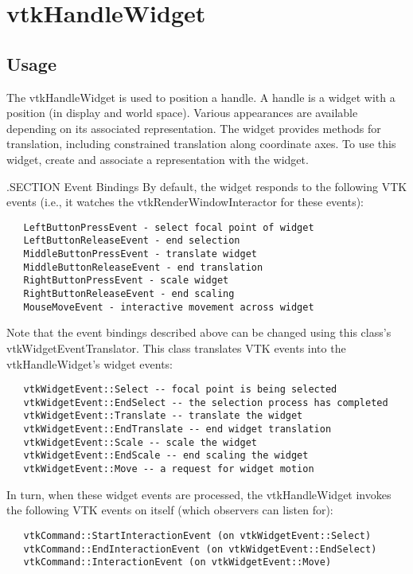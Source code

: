 \section{vtkHandleWidget}

\subsection{Usage}

 The vtkHandleWidget is used to position a handle.  A handle is a widget
 with a position (in display and world space). Various appearances are
 available depending on its associated representation. The widget provides
 methods for translation, including constrained translation along
 coordinate axes. To use this widget, create and associate a representation
 with the widget.

 .SECTION Event Bindings
 By default, the widget responds to the following VTK events (i.e., it
 watches the vtkRenderWindowInteractor for these events):
 \begin{verbatim}
   LeftButtonPressEvent - select focal point of widget
   LeftButtonReleaseEvent - end selection
   MiddleButtonPressEvent - translate widget
   MiddleButtonReleaseEvent - end translation
   RightButtonPressEvent - scale widget
   RightButtonReleaseEvent - end scaling
   MouseMoveEvent - interactive movement across widget
 \end{verbatim}

 Note that the event bindings described above can be changed using this
 class's vtkWidgetEventTranslator. This class translates VTK events 
 into the vtkHandleWidget's widget events:
 \begin{verbatim}
   vtkWidgetEvent::Select -- focal point is being selected
   vtkWidgetEvent::EndSelect -- the selection process has completed
   vtkWidgetEvent::Translate -- translate the widget
   vtkWidgetEvent::EndTranslate -- end widget translation
   vtkWidgetEvent::Scale -- scale the widget
   vtkWidgetEvent::EndScale -- end scaling the widget
   vtkWidgetEvent::Move -- a request for widget motion
 \end{verbatim}

 In turn, when these widget events are processed, the vtkHandleWidget
 invokes the following VTK events on itself (which observers can listen for):
 \begin{verbatim}
   vtkCommand::StartInteractionEvent (on vtkWidgetEvent::Select)
   vtkCommand::EndInteractionEvent (on vtkWidgetEvent::EndSelect)
   vtkCommand::InteractionEvent (on vtkWidgetEvent::Move)
 \end{verbatim}


